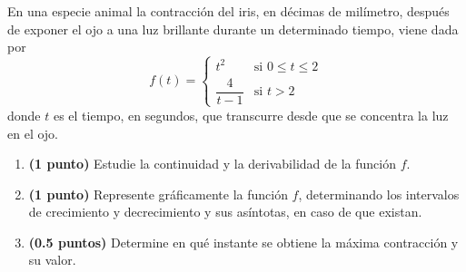 
En una especie animal la contracción del iris, en décimas de milímetro, después de exponer el ojo a una luz brillante durante un determinado tiempo, viene dada por
\[
f(t)=\begin{cases}
t^2 & \text{si }0\leq t\leq 2\\[4pt]
\dfrac{4}{t-1} & \text{si }t>2
\end{cases}
\]
donde $t$ es el tiempo, en segundos, que transcurre desde que se concentra la luz en el ojo.
\begin{enumerate}[label=\alph*)]
\item \textbf{(1 punto)} Estudie la continuidad y la derivabilidad de la función $f$.
\item \textbf{(1 punto)} Represente gráficamente la función $f$, determinando los intervalos de crecimiento y decrecimiento y sus asíntotas, en caso de que existan.
\item \textbf{(0.5 puntos)} Determine en qué instante se obtiene la máxima contracción y su valor.
\end{enumerate}
